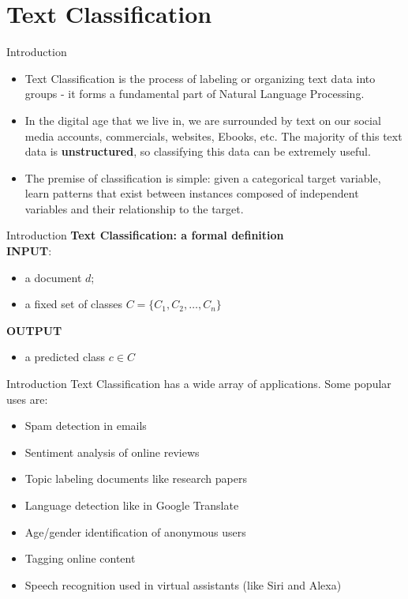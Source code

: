 \documentclass[11pt]{beamer}
\begin{document}
\section{Text Classification}
\begin{frame}{Introduction}
	\begin{itemize}
		\item Text Classification is the process of labeling or organizing text data into groups - it forms a fundamental part of Natural Language Processing.
		\item In the digital age that we live in, we are surrounded by text on our social media accounts, commercials, websites, Ebooks, etc. The majority of this text data is \textbf{unstructured}, so classifying this data can be extremely useful.
		\item The premise of classification is simple: given a categorical target variable, learn patterns that exist between instances composed of independent variables and their relationship to the target. 
	\end{itemize}
\end{frame}
\begin{frame}{Introduction}
\textbf{Text Classification: a formal definition}\\
\vspace{0.5cm}
\textbf{INPUT}:
\begin{itemize}
\item a document $d$;
\item a fixed set of classes $C=\{C_1, C_2, \dots, C_n \}$
\end{itemize}
\vspace{0.5cm}
\textbf{OUTPUT}
\begin{itemize}
\item a predicted class $c \in C$
\end{itemize}
\end{frame}
\begin{frame}{Introduction}
	Text Classification has a wide array of applications. Some popular uses are:
	\begin{itemize}
		\item Spam detection in emails
		\item Sentiment analysis of online reviews
		\item Topic labeling documents like research papers
		\item Language detection like in Google Translate
		\item Age/gender identification of anonymous users
		\item Tagging online content
		\item Speech recognition used in virtual assistants (like Siri and Alexa)
	\end{itemize}
\end{frame}
\end{document}
